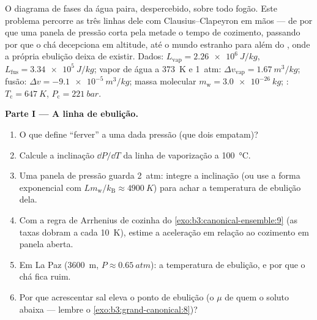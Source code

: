 \begin{problem}\label{pb:b3:phase-transitions:1}
O diagrama de fases da água paira, despercebido, sobre todo fogão. Este
problema percorre as três linhas dele com Clausius--Clapeyron em mãos
--- de por que uma panela de pressão corta pela metade o tempo de
cozimento, passando por que o chá decepciona em altitude, até o mundo
estranho para além do , onde a própria ebulição deixa de
existir. Dados: $L_{\text{vap}}
= \qty{2.26e6}{J/kg}$, $L_{\text{fus}} = \qty{3.34e5}{J/kg}$;
vapor de água a \qty{373}{K} e \qty{1}{atm}: $\Delta v_{\text{vap}}
= \qty{1.67}{m^3/kg}$; fusão: $\Delta v = \qty{-9.1e-5}{m^3/kg}$;
massa molecular $m_{\text{w}} = \qty{3.0e-26}{kg}$; :
$T_{\text{c}} = \qty{647}{K}$, $P_{\text{c}} = \qty{221}{bar}$.

\medskip\noindent\textbf{Parte I --- A linha de ebulição.}
\begin{enumerate}
  \item O que define ``ferver'' a uma dada pressão (que dois
         empatam)?
  \item Calcule a inclinação $\dd P/\dd T$ da linha de vaporização
        a \qty{100}{\celsius}.
  \item Uma panela de pressão guarda \qty{2}{atm}: integre a inclinação
        (ou use a forma exponencial com $Lm_{\text{w}}/
        k_{\text{B}} \approx \qty{4900}{K}$) para achar a
        temperatura de ebulição dela.
  \item Com a regra de Arrhenius de cozinha do
        \cref{exo:b3:canonical-ensemble:9} (as taxas dobram a cada
        \qty{10}{K}), estime a aceleração em relação ao cozimento em
        panela aberta.
  \item Em La Paz (\qty{3600}{m}, $P \approx \qty{0.65}{atm}$):
        a temperatura de ebulição, e por que o chá fica ruim.
  \item Por que acrescentar sal eleva o ponto de ebulição (o $\mu$ de
        quem o soluto abaixa --- lembre o
        \cref{exo:b3:grand-canonical:8})?
\end{enumerate}


\end{problem}
